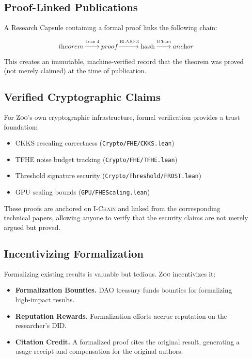 \documentclass[11pt,letterpaper]{article}
\theoremstyle{definition}
\theoremstyle{remark}
\newcommand{\Zoo}{\textsc{Zoo}}
\newcommand{\IChain}{\textsc{I-Chain}}
\newcommand{\DID}{\textsc{DID}}
\newcommand{\DAO}{\textsc{DAO}}
\newcommand{\CKKS}{\textsc{CKKS}}
\begin{document}
\subsection{Proof-Linked Publications}

A Research Capsule containing a formal proof links the following chain:

\begin{equation}
\textit{theorem} \xrightarrow{\text{Lean 4}} \textit{proof} \xrightarrow{\text{BLAKE3}} \textit{hash} \xrightarrow{\text{IChain}} \textit{anchor}
\end{equation}

This creates an immutable, machine-verified record that the theorem was proved (not merely claimed) at the time of publication.

\subsection{Verified Cryptographic Claims}

For \Zoo{}'s own cryptographic infrastructure, formal verification provides a trust foundation:

\begin{itemize}
    \item \CKKS{} rescaling correctness (\texttt{Crypto/FHE/CKKS.lean}) \cite{zoo-fhe}
    \item \textsc{TFHE} noise budget tracking (\texttt{Crypto/FHE/TFHE.lean})
    \item Threshold signature security (\texttt{Crypto/Threshold/FROST.lean})
    \item GPU scaling bounds (\texttt{GPU/FHEScaling.lean})
\end{itemize}

These proofs are anchored on \IChain{} and linked from the corresponding technical papers, allowing anyone to verify that the security claims are not merely argued but proved.

\subsection{Incentivizing Formalization}

Formalizing existing results is valuable but tedious. \Zoo{} incentivizes it:

\begin{itemize}
    \item \textbf{Formalization Bounties.} \DAO{} treasury funds bounties for formalizing high-impact results.
    \item \textbf{Reputation Rewards.} Formalization efforts accrue reputation on the researcher's \DID{}.
    \item \textbf{Citation Credit.} A formalized proof cites the original result, generating a usage receipt and compensation for the original authors.
\end{itemize}
\end{document}
